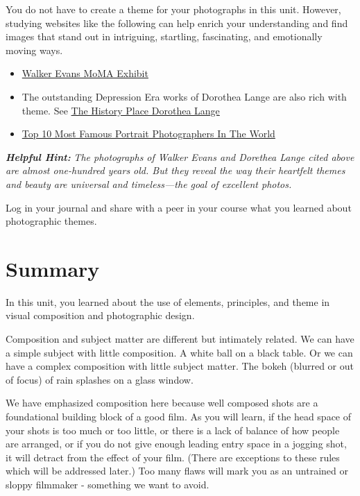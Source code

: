 \documentclass[
]{book}
\providecommand{\tightlist}{%
  \setlength{\itemsep}{0pt}\setlength{\parskip}{0pt}}
\begin{document}
\begin{reflect}
You do not have to create a theme for your photographs in this unit. However, studying websites like the following can help enrich your understanding and find images that stand out in intriguing, startling, fascinating, and emotionally moving ways.

\begin{itemize}
\tightlist
\item
  \href{https://www.moma.org/artists/1777}{Walker Evans MoMA Exhibit}
\item
  The outstanding Depression Era works of Dorothea Lange are also rich with theme. See \href{http://www.historyplace.com/unitedstates/lange/}{The History Place Dorothea Lange}
\item
  \href{https://www.boredpanda.com/top-10-photographers-for-travel-portraits/?utm_source=google\&utm_medium=organic\&utm_campaign=organic}{Top 10 Most Famous Portrait Photographers In The World}
\end{itemize}

\textbf{\emph{Helpful Hint:}} \emph{The photographs of Walker Evans and Dorethea Lange cited above are almost one-hundred years old. But they reveal the way their heartfelt themes and beauty are universal and timeless---the goal of excellent photos.}

Log in your journal and share with a peer in your course what you learned about photographic themes.
\end{reflect}

\hypertarget{summary-2}{%
\section*{Summary}\label{summary-2}}

In this unit, you learned about the use of elements, principles, and theme in visual composition and photographic design.

Composition and subject matter are different but intimately related. We can have a simple subject with little composition. A white ball on a black table. Or we can have a complex composition with little subject matter. The bokeh (blurred or out of focus) of rain splashes on a glass window.

We have emphasized composition here because well composed shots are a foundational building block of a good film. As you will learn, if the head space of your shots is too much or too little, or there is a lack of balance of how people are arranged, or if you do not give enough leading entry space in a jogging shot, it will detract from the effect of your film. (There are exceptions to these rules which will be addressed later.) Too many flaws will mark you as an untrained or sloppy filmmaker - something we want to avoid.
\end{document}
